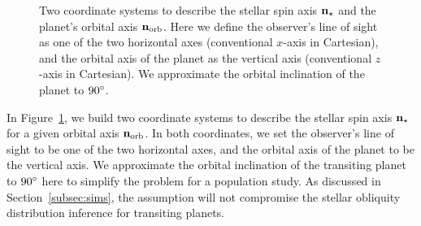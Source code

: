 \documentclass[twocolumn,times]{aastex631}
\begin{document}
\begin{figure*}[ht!]
    \vspace*{-1cm}
    \caption{Two coordinate systems to describe the stellar spin axis $\bf{n}_{\star}$ and the planet's orbital axis $\bf{n}_{\rm orb}$. Here we define the observer's line of sight as one of the two horizontal axes (conventional $x$-axis in Cartesian), and the orbital axis of the planet as the vertical axis (conventional $z$-axis in Cartesian). We approximate the orbital inclination of the planet to $90\mbox{$^\circ$}$.}
    \label{fig:coord}
\end{figure*}

In Figure~\ref{fig:coord}, we build two coordinate systems to describe the stellar spin axis $\bf{n}_{\star}$ for a given orbital axis $\bf{n}_{\rm orb}$. In both coordinates, we set the observer's line of sight to be one of the two horizontal axes, and the orbital axis of the planet to be the vertical axis. We approximate the orbital inclination of the transiting planet to $90\mbox{$^\circ$}$ here to simplify the problem for a population study. As discussed in Section~\ref{subsec:sims}, the assumption will not compromise the stellar obliquity distribution inference for transiting planets.
\end{document}
